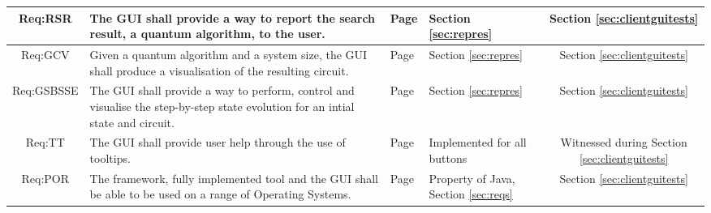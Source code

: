 \begin{landscape}
\begin{longtable}{|c|m{10cm}|m{3cm}|m{3cm}|m{4cm}|}
Req:RSR &
The GUI shall provide a way to report the search result, a quantum algorithm, to the user. &
Page \pageref{sec:reqrsr} &
Section \ref{sec:repres} &
\multicolumn{1}{c|}{Section \ref{sec:clientguitests}} \\ \hline

Req:GCV &
Given a quantum algorithm and a system size, the GUI shall produce a visualisation of the resulting circuit. &
Page \pageref{sec:reqgcv} &
Section \ref{sec:repres} &
\multicolumn{1}{c|}{Section \ref{sec:clientguitests}} \\ \hline

Req:GSBSSE &
The GUI shall provide a way to perform, control and visualise the step-by-step state evolution for an intial state and circuit. &
Page \pageref{sec:reqgsbsse} &
Section \ref{sec:repres} &
\multicolumn{1}{c|}{Section \ref{sec:clientguitests}} \\ \hline

Req:TT &
The GUI shall provide user help through the use of tooltips. &
Page \pageref{sec:reqtt} &
Implemented for all buttons&
\multicolumn{1}{c|}{Witnessed during Section \ref{sec:clientguitests}} \\ \hline

Req:POR &
The framework, fully implemented tool and the GUI shall be able to be used on a range of Operating Systems. &
Page \pageref{sec:reqpor} &
Property of Java, Section \ref{sec:reqs} &
\multicolumn{1}{c|}{Section \ref{sec:clientguitests}} \\ \hline

\end{longtable}
\end{landscape}
\clearpage